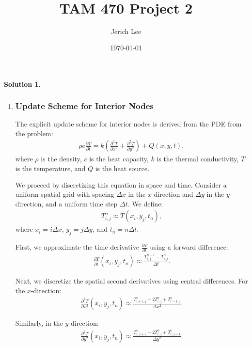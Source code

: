 \documentclass[12pt]{article}
\title{TAM 470 Project 2}
\author{Jerich Lee}
\date{\today}
\theoremstyle{definition} %
\newtheorem{solution}{Solution}
\theoremstyle{plain} %
\begin{document}
\maketitle

\begin{solution}
\noindent
    \begin{enumerate}
        \item \subsubsection*{Update Scheme for Interior Nodes}

        The explicit update scheme for interior nodes is derived from the PDE from the problem:
        \begin{align}
        \rho c \frac{\partial T}{\partial t} = k \left( \frac{\partial^2 T}{\partial x^2} + \frac{\partial^2 T}{\partial y^2} \right) + Q(x, y, t),
        \end{align}
        where $\rho$ is the density, $c$ is the heat capacity, $k$ is the thermal conductivity, $T$ is the temperature, and $Q$ is the heat source.
        
        \noindent We proceed by discretizing this equation in space and time. Consider a uniform spatial grid with spacing $\Delta x$ in the $x$-direction and $\Delta y$ in the $y$-direction, and a uniform time step $\Delta t$. We define:
        \begin{align}
        T_{i,j}^n \approx T(x_i, y_j, t_n),
        \end{align}
        where $x_i = i \Delta x$, $y_j = j \Delta y$, and $t_n = n \Delta t$.
        
        \noindent First, we approximate the time derivative $\frac{\partial T}{\partial t}$ using a forward difference:
        \begin{align}
        \frac{\partial T}{\partial t}(x_i, y_j, t_n) \approx \frac{T_{i,j}^{n+1} - T_{i,j}^n}{\Delta t}.
        \end{align}
        
        \noindent Next, we discretize the spatial second derivatives using central differences. For the $x$-direction:
        \begin{align}
        \frac{\partial^2 T}{\partial x^2}(x_i, y_j, t_n) \approx \frac{T_{i+1,j}^n - 2T_{i,j}^n + T_{i-1,j}^n}{\Delta x^2}.
        \end{align}
        
        \noindent Similarly, in the $y$-direction:
        \begin{align}
        \frac{\partial^2 T}{\partial y^2}(x_i, y_j, t_n) \approx \frac{T_{i,j+1}^n - 2T_{i,j}^n + T_{i,j-1}^n}{\Delta y^2}.
        \end{align}
        

\end{enumerate}
\end{solution}
\end{document}
